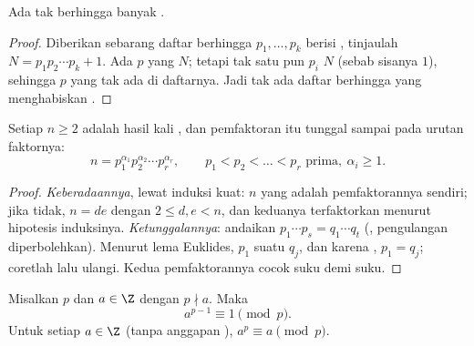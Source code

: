 \begin{theorem}[Euklides]\label{thm:g12:arith:infiniteprimes}
Ada tak berhingga banyak .
\end{theorem}

\begin{proof}
Diberikan sebarang daftar berhingga $p_1, \dots, p_k$ berisi , tinjaulah
$N = p_1 p_2 \cdots p_k + 1$. Ada  $p$ yang  $N$; tetapi tak satu pun $p_i$
 $N$ (sebab sisanya $1$), sehingga $p$  yang tak ada di daftarnya. Jadi tak
ada daftar berhingga yang menghabiskan .
\end{proof}

\begin{theorem}\label{thm:g12:arith:fta}
Setiap  $n \geq 2$ adalah hasil kali , dan pemfaktoran
itu tunggal sampai pada urutan faktornya:
\[
n = p_1^{\alpha_1} p_2^{\alpha_2} \cdots p_r^{\alpha_r},
\qquad p_1 < p_2 < \dots < p_r \text{ prima},\ \alpha_i \geq 1 .
\]
\end{theorem}

\begin{proof}
\emph{Keberadaannya}, lewat induksi kuat: $n$ yang  adalah pemfaktorannya
sendiri; jika tidak, $n = de$ dengan $2 \leq d, e < n$, dan keduanya terfaktorkan
menurut hipotesis induksinya. \emph{Ketunggalannya}: andaikan
$p_1\cdots p_s = q_1 \cdots q_t$ (, pengulangan diperbolehkan). Menurut
lema Euklides, $p_1$  suatu $q_j$, dan karena , $p_1 = q_j$;
coretlah lalu ulangi. Kedua pemfaktorannya cocok suku demi suku.
\end{proof}

\begin{theorem}\label{thm:g12:arith:fermat}
Misalkan $p$  dan $a \in \Z$ dengan $p \nmid a$. Maka
\[
a^{p-1} \equiv 1 \pmod p .
\]
Untuk setiap $a \in \Z$ (tanpa anggapan ), $a^p \equiv a \pmod p$.
\end{theorem}

